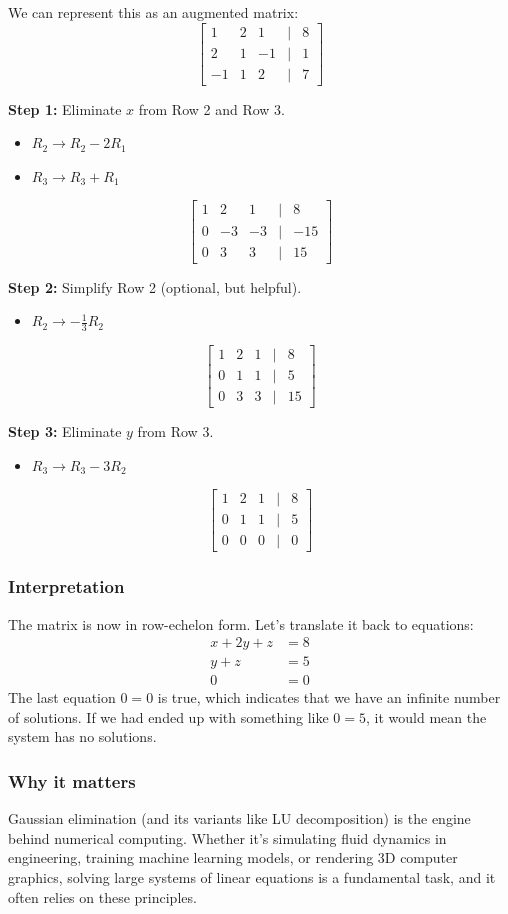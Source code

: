 We can represent this as an augmented matrix:
\[
\begin{bmatrix}
    1 & 2 & 1 & | & 8 \\
    2 & 1 & -1 & | & 1 \\
    -1 & 1 & 2 & | & 7
\end{bmatrix}
\]

\textbf{Step 1:} Eliminate $x$ from Row 2 and Row 3.
\begin{itemize}
    \item $R_2 \to R_2 - 2R_1$
    \item $R_3 \to R_3 + R_1$
\end{itemize}
\[
\begin{bmatrix}
    1 & 2 & 1 & | & 8 \\
    0 & -3 & -3 & | & -15 \\
    0 & 3 & 3 & | & 15
\end{bmatrix}
\]

\textbf{Step 2:} Simplify Row 2 (optional, but helpful).
\begin{itemize}
    \item $R_2 \to -\frac{1}{3}R_2$
\end{itemize}
\[
\begin{bmatrix}
    1 & 2 & 1 & | & 8 \\
    0 & 1 & 1 & | & 5 \\
    0 & 3 & 3 & | & 15
\end{bmatrix}
\]

\textbf{Step 3:} Eliminate $y$ from Row 3.
\begin{itemize}
    \item $R_3 \to R_3 - 3R_2$
\end{itemize}
\[
\begin{bmatrix}
    1 & 2 & 1 & | & 8 \\
    0 & 1 & 1 & | & 5 \\
    0 & 0 & 0 & | & 0
\end{bmatrix}
\]

\subsubsection*{Interpretation}
The matrix is now in row-echelon form. Let's translate it back to equations:
\begin{align*}
    x + 2y + z &= 8 \\
    y + z &= 5 \\
    0 &= 0
\end{align*}
The last equation $0 = 0$ is true, which indicates that we have an infinite number of solutions. If we had ended up with something like $0 = 5$, it would mean the system has no solutions.

\subsubsection*{Why it matters}
Gaussian elimination (and its variants like LU decomposition) is the engine behind numerical computing. Whether it's simulating fluid dynamics in engineering, training machine learning models, or rendering 3D computer graphics, solving large systems of linear equations is a fundamental task, and it often relies on these principles.

